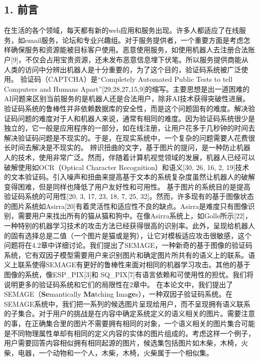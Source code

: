 \subsection{1. 前言}\label{ux524dux8a00}

在生活的各个领域，每天都有新的web应用和服务出现。许多人都适应了在线服务，如email服务，论坛和专业兴趣组。对于服务提供者，一个重要方面是考虑怎样确保服务和资源能被目标客户使用。恶意使用服务，如使用机器人去注册合法账户{[}9{]}，不仅会占用宝贵资源，还未发布恶意信息埋下伏笔。所以服务提供商能从人类的访问中分辨出机器人是十分重要的，为了这个目的，验证码系统被广泛使用。
验证码（CAPTCHA）是``Completely Automated Public Tests to tell Computers
and Humans
Apart''{[}29,28,27,15,9{]}的缩写。主要思想是出一道困难的AI问题来区别当前服务的是机器人还是合法用户，除非AI技术获得突破性进展。验证码系统的鲁棒性并非依赖数据库的安全性，而是这个问题固有的难度。解决验证码问题的难度对于人和机器人来说，通常有相同的难度。因为验证码系统很少是独立的，它一般是应用程序的一部分，如在线注册，让用户花多于几秒钟的时间去解决验证码问题是不现实的。于是，在现实系统中，一个复杂的问题需要人花费很长时间去解决是不现实的。
辨识扭曲的文字，基于图片的提问，是一种防止机器人的技术，使用非常广泛。然而，伴随着计算机视觉领域的发展，机器人已经可以破解使用如OCR（Optical
Character Recognition）和语义{[}30, 26, 16, 2,
19{]}技术的文本验证码。引入噪声和扭曲来提高基于文本的系统复杂度虽然让机器人的破解变得困难，但是同样也降低了用户友好性和可用性。
基于图片的系统目的是提高验证码系统的可用性{[}20, 3, 17, 23, 18, 7, 25,
32{]}。然而，许多现有的基于图像状态的图片系统如Asirra{[}20{]}有着灵活性和适应性不良的缺点。Asirra是难度只有图像识别，需要用户来找出所有的猫从猫和狗中。在像Asirra系统上，如Golle所示{[}22{]}，一种特别的机器学习技术的攻击方法已经获得很高的识别率。此外，呈现给机器人的固有选择总是二值（一个图片是猫或是狗），让它对模板适应攻击很敏感，这个问题将在4.2章中详细讨论。我们提出了SEMAGE，一种新奇的基于图像的验证码系统，它有双因子模型需要用户来识别图片和确定图片所共有的语义上的联系。语义上联系使得SEMAGE有更好的鲁棒性来面对相同的机器学习攻击。其他的基于图像的系统，像ESP\_PIX{[}3{]}和
SQ\_PIX{[}7{]}有语言依赖和可使用性的担忧。我们将说明更多的验证码系统和它们的局限性在2章中。
在本论文中，我们提出了SEMAGE（\textbf{Se}mantically \textbf{Ma}tching
Ima\textbf{ge}s），一种双因子验证码系统。在SEMAGE系统中，我们把一系列的候选图片呈现给用户，而不呈现拥有语义联系的子集合。对于用户的挑战是在内容中确定系统定义的语义相关的图片。需要注意的事，在正确集合里的图片不需要拥有相同的对象，一个语义相关的图片集合可能是不同物理属性单却有相同的定义内容的实体的图片组成的。考虑这样一个例子，用户需要回答内容相似拥有相同起源的图片，候选集包括图片如木柴，木椅，火柴，电器，一个动物和一个人，木柴，木椅，火柴属于一个相似集。
